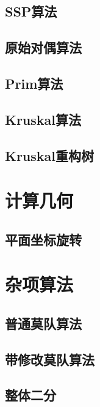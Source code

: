 \documentclass[twocolumn,a4]{article}  %
\begin{document}
		\subsection{SSP算法}
	 	 	
	 	 	
		\subsection{原始对偶算法}
	 	 	
	 	 	
		\subsection{Prim算法}
	 	 	
	 	 	
		\subsection{Kruskal算法}
	 	 	
	 	 	
		\subsection{Kruskal重构树}
	 	 	
	 	 	
	\section{计算几何}
		\subsection{平面坐标旋转}
	 	 	
	
	\section{杂项算法}
		\subsection{普通莫队算法}
	 	 	
	 	 	
	 	\subsection{带修改莫队算法}
	 	 	
	 	 	
	 	\subsection{整体二分}
	 	 	
	 	 	
\end{document}
